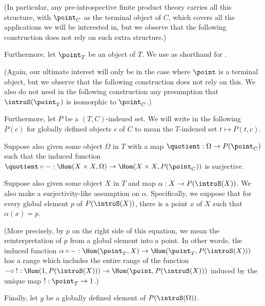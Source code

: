 (In particular, any pre-introspective finite product theory carries all this structure, with $\point_C$ as the terminal object of $C$, which covers all the applications we will be interested in, but we observe that the following construction does not rely on such extra structure.)

Furthermore, let $\point_T$ be an object of $T$. We use  as shorthand for .

(Again, our ultimate interest will only be in the case where $\point$ is a terminal object, but we observe that the following construction does not rely on this. We also do not need in the following construction any presumption that $\introS(\point_T)$ is isomorphic to $\point_C$.)

Furthermore, let $P$ be a $(T, C)$-indexed set. We will write in the following $P(c)$ for globally defined objects $c$ of $C$ to mean the $T$-indexed set $t \mapsto P(t, c)$.

Suppose also given some object $\Omega$ in $T$ with a map $\quotient : \Omega \to P(\point_C)$ such that the induced function $\quotient \circ - : \Hom(X \times X, \Omega) \to \Hom(X \times X, P(\point_C))$ is surjective.

Suppose also given some object $X$ in $T$ and map $\alpha : X \to P(\introS(X))$. We also make a surjectivity-like assumption on $\alpha$. Specifically, we suppose that for every global element $p$ of $P(\introS(X))$, there is a point $x$ of $X$ such that $\alpha(x) = p$.

(More precisely, by $p$ on the right side of this equation, we mean the reinterpretation of $p$ from a global element into a point. In other words, the induced function $\alpha \circ - : \Hom(\point_T, X) \to \Hom(\point_T, P(\introS(X)))$ has a range which includes the entire range of the function $- \circ \; ! : \Hom(1, P(\introS(X))) \to \Hom(\point, P(\introS(X)))$ induced by the unique map $! : \point_T \to 1$.)

Finally, let $g$ be a globally defined element of $P(\introS(\Omega))$.

